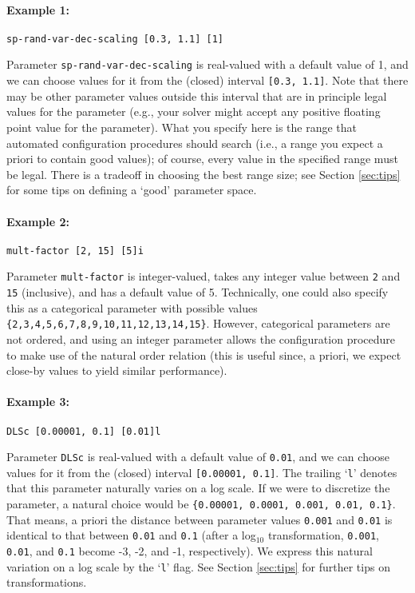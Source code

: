 \documentclass[manual.tex]{subfiles}
\begin{document}
\paragraph{Example 1:}

\begin{verbatim}
sp-rand-var-dec-scaling [0.3, 1.1] [1]
\end{verbatim}
Parameter \texttt{sp-rand-var-dec-scaling} is real-valued with a default value of 1, and we can choose values for it from the (closed) interval \texttt{[0.3, 1.1]}.
Note that there may be other parameter values outside this interval that are in principle legal values for the parameter (e.g., your solver might accept any positive floating point value for the parameter). What you specify here is the range that automated configuration procedures should search (i.e., a range you expect a priori to contain good values); of course, every value in the specified range must be legal. There is a tradeoff in choosing the best range size; see Section \ref{sec:tips} for some tips on defining a `good' parameter space.

\paragraph{Example 2:}
\begin{verbatim}
mult-factor [2, 15] [5]i
\end{verbatim}
Parameter \texttt{mult-factor} is integer-valued, takes any integer value between \texttt{2} and \texttt{15} (inclusive), and has a default value of 5. 
Technically, one could also specify this as a categorical parameter with possible values \texttt{\{2,3,4,5,6,7,8,9,10,11,12,13,14,15\}}. 
However, categorical parameters are not ordered, and using an integer parameter allows the configuration procedure to make use of the natural order relation (this is useful since, a priori, we expect close-by values to yield similar performance).

\paragraph{Example 3:}
\begin{verbatim}
DLSc [0.00001, 0.1] [0.01]l
\end{verbatim}
Parameter \texttt{DLSc} is real-valued with a default value of \texttt{0.01}, and we can choose values for it from the (closed) interval \texttt{[0.00001, 0.1]}.
The trailing `\texttt{l}' denotes that this parameter naturally varies on a log scale. If we were to discretize the parameter, a natural choice would be
\texttt{\{0.00001, 0.0001, 0.001, 0.01, 0.1\}}. That means, a priori the distance between parameter values \texttt{0.001} and \texttt{0.01} is identical to that between \texttt{0.01} and \texttt{0.1} (after a log$_{10}$ transformation, \texttt{0.001}, \texttt{0.01}, and \texttt{0.1} become -3, -2, and -1, respectively).
We express this natural variation on a log scale by the `\texttt{l}' flag. See Section \ref{sec:tips} for further tips on transformations.
\end{document}
